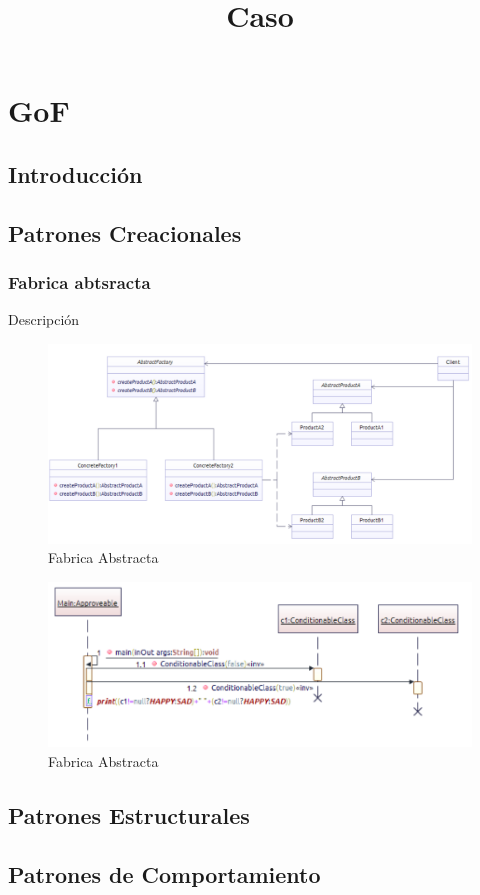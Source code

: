 \section{GoF}
\subsection{Introducción}
\newpage

\subsection{Patrones Creacionales}
\newpage


\subsubsection{Fabrica abtsracta}
Descripción
\begin{figure}[th!]
	\centering
	\includegraphics[width=0.7\linewidth]{arquitectura/diseno/imgs/m_fabrica}
	\caption{Fabrica Abstracta}
\end{figure}

\newpage

\title{Caso}

\begin{figure}[th!]
	\centering
	\includegraphics[width=0.7\linewidth]{arquitectura/diseno/imgs/s_fabrica}
	\caption{Fabrica Abstracta}
\end{figure}

\newpage


\subsection{Patrones Estructurales}
\newpage


\subsection{Patrones de Comportamiento}
\newpage



